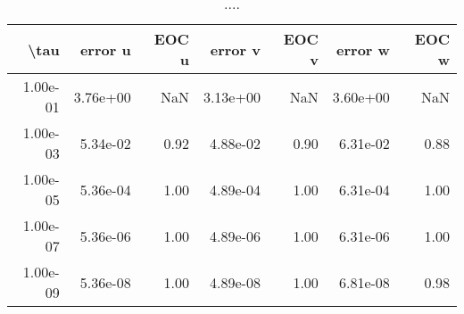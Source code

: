 \begin{table}[ht]
\centering
\begin{tabular}{rrrrrrr}
  \hline
  \textbf{\textbackslash{}tau} & \textbf{error u} & \textbf{EOC u} & \textbf{error v} & \textbf{EOC v} & \textbf{error w} & \textbf{EOC w} \\\hline
  1.00e-01 & 3.76e+00 & NaN & 3.13e+00 & NaN & 3.60e+00 & NaN \\
  1.00e-03 & 5.34e-02 & 0.92 & 4.88e-02 & 0.90 & 6.31e-02 & 0.88 \\
  1.00e-05 & 5.36e-04 & 1.00 & 4.89e-04 & 1.00 & 6.31e-04 & 1.00 \\
  1.00e-07 & 5.36e-06 & 1.00 & 4.89e-06 & 1.00 & 6.31e-06 & 1.00 \\
  1.00e-09 & 5.36e-08 & 1.00 & 4.89e-08 & 1.00 & 6.81e-08 & 0.98 \\\hline
\end{tabular}
\caption{....}
\end{table}
